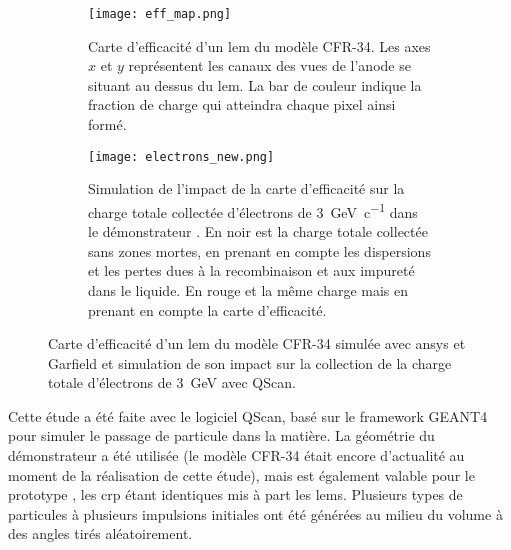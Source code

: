       \begin{figure}[htpb]
        \begin{subfigure}{0.48\textwidth}
          \centering
          \texttt{[image: eff\_map.png]}
          \caption{\label{fig::eff_map}Carte d'efficacité d'un \gls{lem} du modèle CFR-34. Les axes $x$ et $y$ représentent les  canaux des vues de l'anode se situant au dessus du \gls{lem}. La bar de couleur indique la fraction de charge qui atteindra chaque pixel ainsi formé.}
        \end{subfigure}
        \hfill
        \begin{subfigure}{0.48\textwidth}
          \centering
          \texttt{[image: electrons\_new.png]}
          \caption{\label{fig::electron}Simulation de l'impact de la carte d'efficacité sur la charge totale collectée d'électrons de \SI{3}{\giga\eV\per c} dans le démonstrateur \SSS{}. En noir est la charge totale collectée sans zones mortes, en prenant en compte les dispersions et les pertes dues à la recombinaison et aux impureté dans le liquide. En rouge et la même charge mais en prenant en compte la carte d'efficacité.}
        \end{subfigure}
          \caption[Carte d'efficacité d'un \gls{lem} du modèle CFR-34 et impact sur la collection de charge.]{Carte d'efficacité d'un \gls{lem} du modèle CFR-34 simulée avec \gls{ansys} et Garfield et simulation de son impact sur la collection de la charge totale d'électrons de \SI{3}{\giga\eV} avec QScan.}
      \end{figure}
        
      Cette étude a été faite avec le logiciel QScan, basé sur le framework GEANT4 pour simuler le passage de particule dans la matière. La géométrie du démonstrateur \SSS{} a été utilisée (le modèle CFR-34 était encore d'actualité au moment de la réalisation de cette étude), mais est également valable pour le prototype \TOO{}, les \gls{crp} étant identiques mis à part les \glspl{lem}. Plusieurs types de particules à plusieurs impulsions initiales ont été générées au milieu du volume à des angles tirés aléatoirement.
            
